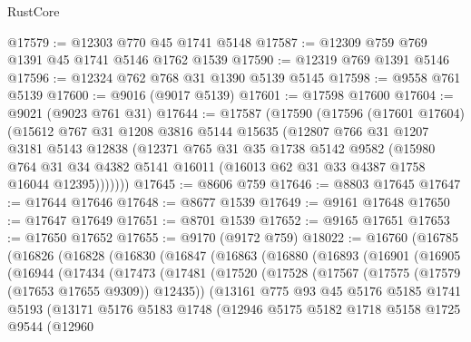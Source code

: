 \begin{lexlean}{RustCore}
\begin{coremodule}
@17579 := @12303 @770 @45 @1741 @5148
@17587 := @12309 @759 @769 @1391 @45 @1741 @5146 @1762 @1539
@17590 := @12319 @769 @1391 @5146
@17596 := @12324 @762 @768 @31 @1390 @5139 @5145
@17598 := @9558 @761 @5139
@17600 := @9016 (@9017 @5139)
@17601 := @17598 @17600
@17604 := @9021 (@9023 @761 @31)
@17644 := @17587
    (@17590
      (@17596
        (@17601 @17604)
        (@15612
          @767
          @31
          @1208
          @3816
          @5144
          @15635
          (@12807
            @766
            @31
            @1207
            @3181
            @5143
            @12838
            (@12371
              @765
              @31
              @35
              @1738
              @5142
              @9582
              (@15980
                @764
                @31
                @34
                @4382
                @5141
                @16011
                (@16013 @62 @31 @33 @4387 @1758 @16044 @12395)))))))
@17645 := @8606 @759
@17646 := @8803 @17645
@17647 := @17644 @17646
@17648 := @8677 @1539
@17649 := @9161 @17648
@17650 := @17647 @17649
@17651 := @8701 @1539
@17652 := @9165 @17651
@17653 := @17650 @17652
@17655 := @9170 (@9172 @759)
@18022 := @16760
    (@16785
      (@16826
        (@16828
          (@16830
            (@16847
              (@16863
                (@16880
                  (@16893
                    (@16901
                      (@16905
                        (@16944
                          (@17434
                            (@17473
                              (@17481
                                (@17520
                                  (@17528
                                    (@17567 (@17575 (@17579 (@17653 @17655 @9309)) @12435))
                                    (@13161
                                      @775
                                      @93
                                      @45
                                      @5176
                                      @5185
                                      @1741
                                      @5193
                                      (@13171
                                        @5176
                                        @5183
                                        @1748
                                        (@12946
                                          @5175
                                          @5182
                                          @1718
                                          @5158
                                          @1725
                                          @9544
                                          (@12960

\end{coremodule}
\end{lexlean}
